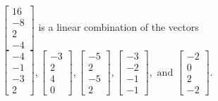 \begin{exercise}
\begin{exerciseStatement}
  \end{exerciseStatement}
  \begin{exerciseAnswer}
   \(\left[\begin{array}{c}
16 \\
-8 \\
2 \\
-4
\end{array}\right]\) 
  	 is  
	a linear combination of the vectors \(\left[\begin{array}{c}
-4 \\
-1 \\
-3 \\
2
\end{array}\right] , \left[\begin{array}{c}
-3 \\
2 \\
4 \\
0
\end{array}\right] , \left[\begin{array}{c}
-5 \\
2 \\
-5 \\
2
\end{array}\right] , \left[\begin{array}{c}
-3 \\
-2 \\
-1 \\
-1
\end{array}\right] , \text{ and } \left[\begin{array}{c}
-2 \\
0 \\
2 \\
-2
\end{array}\right]\).

	
  


  \end{exerciseAnswer}
\end{exercise}